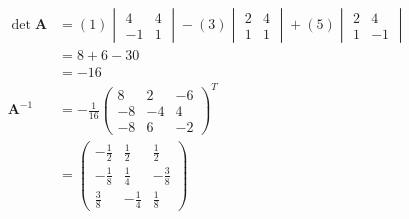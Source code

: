 \documentclass{article}
\begin{document}
\begin{align*}
  \det \mathbf{A} & = (1) \begin{vmatrix}
                            4  & 4 \\
                            -1 & 1
                          \end{vmatrix} - (3) \begin{vmatrix}
                                                2 & 4 \\
                                                1 & 1
                                              \end{vmatrix} + (5) \begin{vmatrix}
                                                                    2 & 4  \\
                                                                    1 & -1
                                                                  \end{vmatrix} \\
                  & = 8 + 6 - 30                                                 \\
                  & = -16                                                        \\
  \mathbf{A}^{-1} & = -\frac{1}{16} \begin{pmatrix}
                                      8  & 2  & -6 \\
                                      -8 & -4 & 4  \\
                                      -8 & 6  & -2
                                    \end{pmatrix}^T                              \\
                  & = \begin{pmatrix}
                        -\frac{1}{2} & \frac{1}{2}  & \frac{1}{2}  \\
                        -\frac{1}{8} & \frac{1}{4}  & -\frac{3}{8} \\
                        \frac{3}{8}  & -\frac{1}{4} & \frac{1}{8}
                      \end{pmatrix}
\end{align*}

\setcounter{subsubsection}{14}
\subsubsection{}
\end{document}
